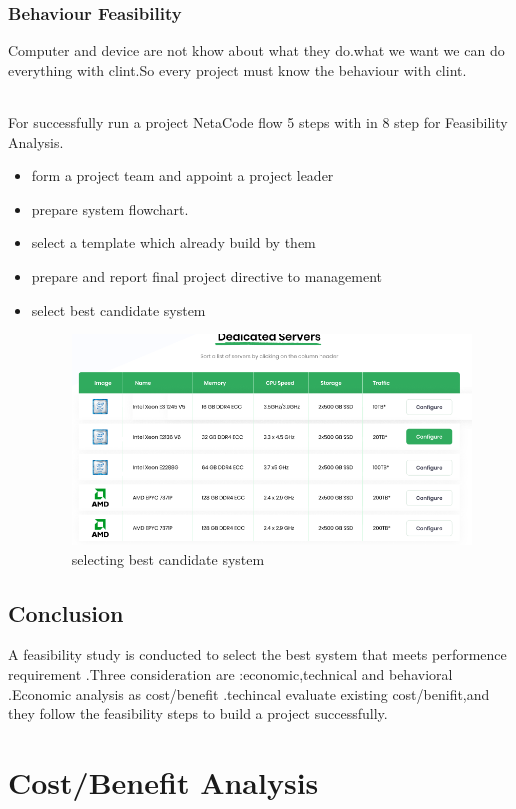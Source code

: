 \documentclass[a4paper,12pt]{report}
\begin{document}
\subsection{Behaviour Feasibility}
Computer and device are not khow about what they do.what we want we can do everything with clint.So every project must know the behaviour with clint.
\subparagraph{}
For successfully run a project NetaCode flow 5 steps with in 8 step for Feasibility Analysis.
\begin{itemize}
	\item form a project team and appoint a project leader
	\item prepare system flowchart.
	\item select a template which  already build by them
	\item prepare and report final project directive to management
	\item select best candidate system
	\begin{figure}[h]
		\centering
		\includegraphics[width=0.9\linewidth]{7_3}
		\caption{selecting best candidate system}
		\label{fig:73}
	\end{figure}
\end{itemize}
\newpage
\section{Conclusion}
A feasibility study is conducted to select the best system that meets performence requirement .Three consideration are :economic,technical and behavioral .Economic analysis as cost/benefit .techincal evaluate existing cost/benifit,and they follow the feasibility steps to build a project successfully.





\chapter{Cost/Benefit Analysis}
\end{document}
